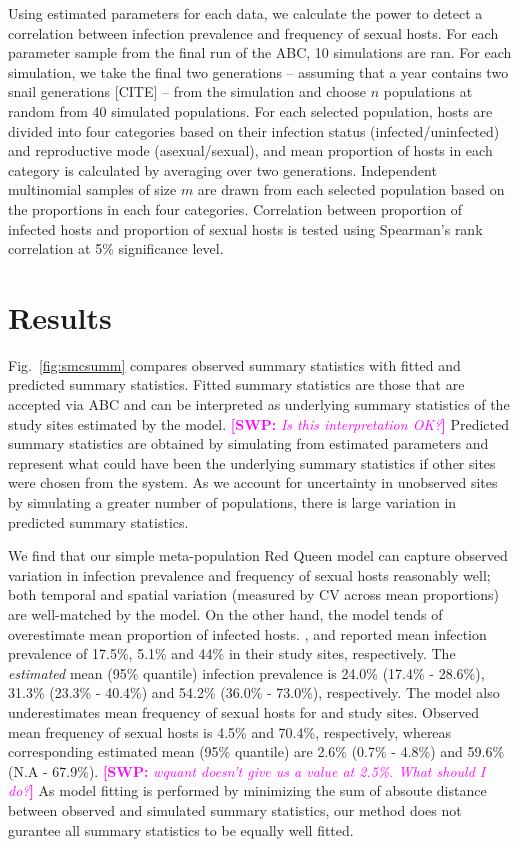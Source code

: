 \documentclass{article}\usepackage[]{graphicx}\usepackage[]{color}
\newcommand{\comment}[3]{\textcolor{#1}{\textbf{[#2: }\textit{#3}\textbf{]}}}
\newcommand{\swp}[1]{\comment{magenta}{SWP}{#1}}
\newcommand{\fref}[1]{Fig.~\ref{fig:#1}}
\begin{document}
Using estimated parameters for each data, we calculate the power to detect a correlation between infection prevalence and frequency of sexual hosts.
For each parameter sample from the final run of the ABC, 10 simulations are ran.
For each simulation, we take the final two generations -- assuming that a year contains two snail generations [CITE] -- from the simulation and choose $n$ populations at random from 40 simulated populations.
For each selected population, hosts are divided into four categories based on their infection status (infected/uninfected) and reproductive mode (asexual/sexual),
and mean proportion of hosts in each category is calculated by averaging over two generations.
Independent multinomial samples of size $m$ are drawn from each selected population based on the proportions  in each four categories. 
Correlation between proportion of infected hosts and proportion of sexual hosts is tested using Spearman's rank correlation at 5\% significance level.

\section{Results}

\fref{smcsumm} compares observed summary statistics with fitted and predicted summary statistics.
Fitted summary statistics are those that are accepted via ABC and can be interpreted as underlying summary statistics of the study sites estimated by the model. \swp{Is this interpretation OK?}
Predicted summary statistics are obtained by simulating from estimated parameters and represent what could have been the underlying summary statistics if other sites were chosen from the system.
As we account for uncertainty in unobserved sites by simulating a greater number of populations, there is large variation in predicted summary statistics.

We find that our simple meta-population Red Queen model can capture observed variation in infection prevalence and frequency of sexual hosts reasonably well;
both temporal and spatial variation (measured by CV across mean proportions) are well-matched by the model. 
On the other hand, the model tends of overestimate mean proportion of infected hosts.
\cite{dagan2013clonal}, \cite{mckone2016fine} and \cite{vergara2014infection} reported mean infection prevalence of 17.5\%, 5.1\% and 44\% in their study sites, respectively.
The \emph{estimated} mean (95\% quantile) infection prevalence is 24.0\% (17.4\% - 28.6\%), 31.3\% (23.3\% - 40.4\%) and 54.2\% (36.0\% - 73.0\%), respectively.
The model also underestimates mean frequency of sexual hosts for \cite{dagan2013clonal} and \cite{vergara2014infection} study sites.
Observed mean frequency of sexual hosts is 4.5\% and 70.4\%, respectively, whereas corresponding estimated mean (95\% quantile) are 2.6\% (0.7\% - 4.8\%) and 59.6\% (N.A - 67.9\%). \swp{wquant doesn't give us a value at 2.5\%. What should I do?}
As model fitting is performed by minimizing the sum of absoute distance between observed and simulated summary statistics, our method does not gurantee all summary statistics to be equally well fitted.
\end{document}
